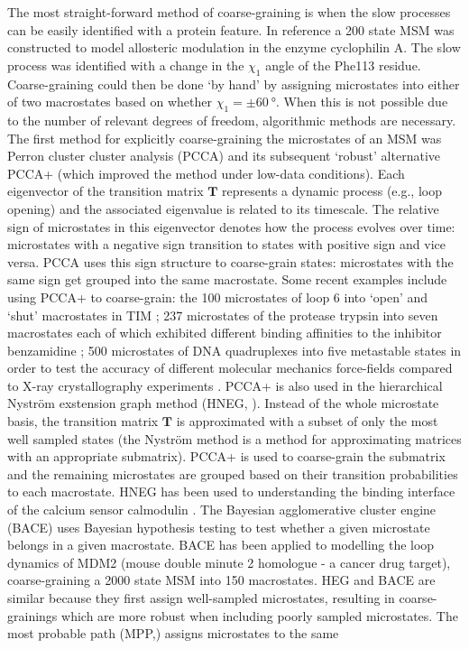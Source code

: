 The most straight-forward method of coarse-graining is when the slow processes can be easily identified with a protein feature.  In reference \cite{wapeesittipanAllostericEffectsCyclophilin2019} a 200 state MSM was constructed to model allosteric modulation in the enzyme cyclophilin A.  The slow process was identified with a change in the $\chi_{1}$ angle of the Phe113 residue.  Coarse-graining could then be done `by hand' by assigning microstates into either of two macrostates based on whether $\chi_{1} = \pm\SI{60}{\degree}$.  When this is not possible due to the number of relevant degrees of freedom, algorithmic methods are necessary. The first method for explicitly coarse-graining the microstates of an MSM was Perron cluster cluster analysis (PCCA) \cite{deuflhardIdentificationAlmostInvariant2000a} and its subsequent `robust' alternative PCCA+ \cite{deuflhardRobustPerronCluster2005b} (which improved the method under low-data conditions).  Each eigenvector of the transition matrix $\mathbf{T}$ represents a dynamic process (e.g., loop opening) and the associated eigenvalue is related to its timescale.  The relative sign of microstates in this eigenvector denotes how the process evolves over time: microstates with a negative sign transition to states with positive sign and vice versa. PCCA uses this sign structure to coarse-grain states: microstates with the same sign get grouped into the same macrostate. Some recent examples include using PCCA+ to coarse-grain: the 100 microstates of loop 6 into `open' and `shut' macrostates in TIM \cite{LoopMotionTriosephosphate}; 237 microstates of the protease trypsin into seven macrostates each of which exhibited different binding affinities  to the inhibitor benzamidine \cite{plattnerProteinConformationalPlasticity2015}; 500 microstates of DNA quadruplexes into five metastable states in order to test the accuracy of different molecular mechanics force-fields compared to X-ray crystallography experiments \cite{islamExploringDynamicsPropeller2017}.  PCCA+ is also used in the hierarchical Nystr{\"o}m exstension graph method (HNEG, \cite{yaoHierarchicalNystromMethods2013a}).  Instead of the whole microstate basis, the transition matrix $\mathbf{T}$ is approximated with a subset of only the most well sampled states (the  Nystr{\"o}m  method is a method for approximating matrices with an appropriate submatrix). PCCA+ is used to coarse-grain the submatrix and the remaining microstates are grouped based on their transition probabilities to each macrostate.  HNEG  has been used to understanding the binding interface of the calcium sensor calmodulin \cite{shuklaConformationalHeterogeneityCalmodulin2016}. The Bayesian agglomerative cluster engine (BACE) \cite{bowmanImprovedCoarsegrainingMarkov2012a} uses Bayesian hypothesis testing to test whether a given microstate belongs in a given macrostate. BACE has been applied to modelling the loop dynamics of MDM2 (mouse double minute 2 homologue - a cancer drug target), coarse-graining a 2000 state MSM into 150 macrostates.  HEG and BACE are similar because they first assign well-sampled microstates, resulting in coarse-grainings which are more robust when including poorly sampled microstates.  The most probable path (MPP,\cite{jainIdentifyingMetastableStates2012a})  assigns microstates to the same 